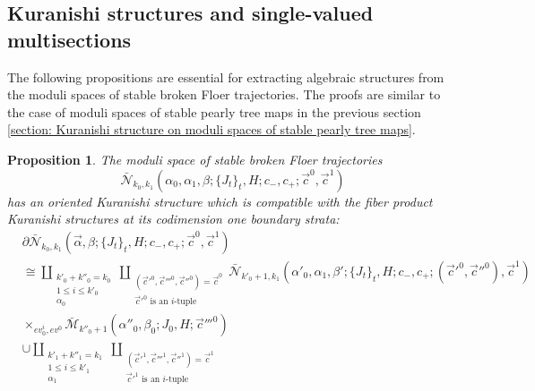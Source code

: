 \documentclass{amsart}
\newtheorem{proposition}[theorem]{Proposition}
\numberwithin{equation}{section}
\numberwithin{figure}{section}
\begin{document}

\subsection{Kuranishi structures and single-valued multisections}

	The following propositions are essential for extracting algebraic structures from the moduli spaces of stable broken Floer trajectories. The proofs are similar to the case of moduli spaces of stable pearly tree maps in the previous section \ref{section: Kuranishi structure on moduli spaces of stable pearly tree maps}. \par

\begin{proposition}\label{Kuranishi structures on the moduli space of stable broken Floer trajectories}
	The moduli space of stable broken Floer trajectories
\begin{equation*}
\bar{\mathcal{N}}_{k_{0}, k_{1}}(\alpha_{0}, \alpha_{1}, \beta; \{J_{t}\}_{t}, H; c_{-}, c_{+}; \vec{c}^{0}, \vec{c}^{1})
\end{equation*}
has an oriented Kuranishi structure which is compatible with the fiber product Kuranishi structures at its codimension one boundary strata:
\begin{equation}\label{boundary stratum of the moduli space of broken stable Floer trajectories}
\begin{split}
&\partial \bar{\mathcal{N}}_{k_{0}, k_{1}}(\vec{\alpha}, \beta; \{J_{t}\}_{t}, H; c_{-}, c_{+}; \vec{c}^{0}, \vec{c}^{1})\\
&\cong \coprod_{\substack{k'_{0}+k''_{0}=k_{0}\\ 1 \le i \le k'_{0}\\ \alpha_{0}}} \coprod_{\substack{(\vec{c}'^{0}, \vec{c}'''^{0}, \vec{c}''^{0}) = \vec{c}^{0}\\ \text{$\vec{c}'^{0}$ is an $i$-tuple}}}
\bar{\mathcal{N}}_{k'_{0}+1, k_{1}}(\alpha'_{0}, \alpha_{1}, \beta'; \{J_{t}\}_{t}, H; c_{-}, c_{+}; (\vec{c}'^{0}, \vec{c}''^{0}), \vec{c}^{1})\\
&\times_{ev_{0}^{i}, ev^{0}} \bar{\mathcal{M}}_{k''_{0}+1}(\alpha''_{0}, \beta_{0}; J_{0}, H; \vec{c}'''^{0})\\
&\cup \coprod_{\substack{k'_{1}+k''_{1}=k_{1}\\ 1 \le i \le k'_{1}\\ \alpha_{1}}} \coprod_{\substack{(\vec{c}'^{1}, \vec{c}'''^{1}, \vec{c}''^{1}) = \vec{c}^{1}\\ \text{$\vec{c}'^{1}$ is an $i$-tuple}}}

\end{split}
\end{equation}
\end{proposition}
\end{document}
